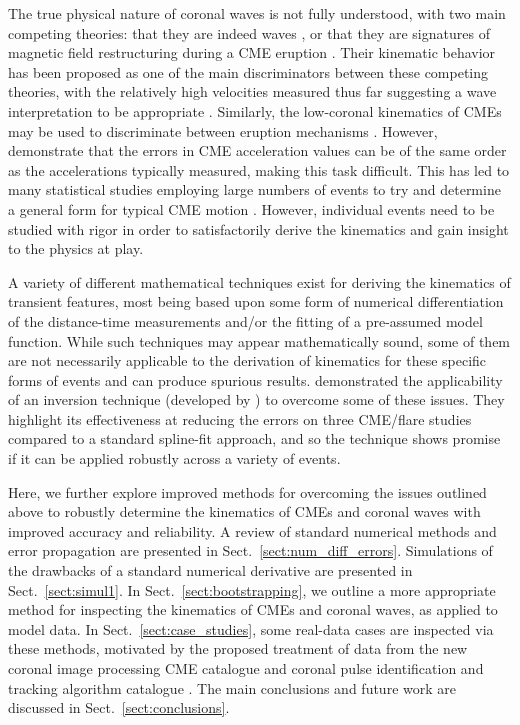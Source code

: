 \documentclass[referee]{aa}
\begin{document}
The true physical nature of coronal waves is not fully understood, with two main competing theories: that they are indeed waves \citep[e.g.,][]{2010ApJ...716L..57V, 2012ApJ...754....7S}, or that they are signatures of magnetic field restructuring during a CME eruption \citep[e.g.,][]{2011ApJ...738..167S,2011ApJ...732L..20C}. Their kinematic behavior has been proposed as one of the main discriminators between these competing theories, with the relatively high velocities measured thus far suggesting a wave interpretation to be appropriate \citep{2011A&A...532A.151W, 2012ApJ...753..112Z}. Similarly, the low-coronal kinematics of CMEs may be used to discriminate between eruption mechanisms \citep[see, for example,][and the CME models discussed therein]{2010A&A...516A..44L}. However, \citet{2007ApJ...657.1117W} demonstrate that the errors in CME acceleration values can be of the same order as the accelerations typically measured, making this task difficult. This has led to many statistical studies employing large numbers of events to try and determine a general form for typical CME motion \citep[e.g.,][]{2000GeoRL..27..145G, 2003AdSpR..32.2637D, 2006ApJ...649.1100Z}. However, individual events need to be studied with rigor in order to satisfactorily derive the kinematics and gain insight to the physics at play.

A variety of different mathematical techniques exist for deriving the kinematics of transient features, most being based upon some form of numerical differentiation of the distance-time measurements and/or the fitting of a pre-assumed model function. While such techniques may appear mathematically sound, some of them are not necessarily applicable to the derivation of kinematics for these specific forms of events and can produce spurious results. \citet{2010ApJ...712.1410T} demonstrated the applicability of an inversion technique (developed by \citealt{2005SoPh..227..299K}) to overcome some of these issues. They highlight its effectiveness at reducing the errors on three CME/flare studies compared to a standard spline-fit approach, and so the technique shows promise if it can be applied robustly across a variety of events.

Here, we further explore improved methods for overcoming the issues outlined above to robustly determine the kinematics of CMEs and coronal waves with improved accuracy and reliability. A review of standard numerical methods and error propagation are presented in Sect.~\ref{sect:num_diff_errors}. Simulations of the drawbacks of a standard numerical derivative are presented in Sect.~\ref{sect:simul1}. In Sect.~\ref{sect:bootstrapping}, we outline a more appropriate method for inspecting the  kinematics of CMEs and coronal waves, as applied to model data. In Sect.~\ref{sect:case_studies}, some real-data cases are inspected via these methods, motivated by the proposed treatment of data from the new coronal image processing CME catalogue \citep[CORIMP;][]{2012ApJ...752..144M, 2012ApJ...752..145B} and coronal pulse identification and tracking algorithm catalogue \citep[CorPITA;][]{2011A&A...531A..42L}. The main conclusions and future work are discussed in Sect.~\ref{sect:conclusions}.
\end{document}
